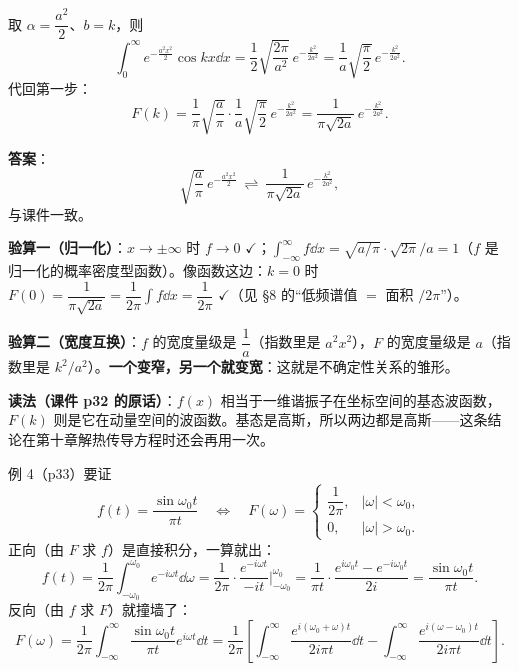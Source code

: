 \documentclass[11pt]{ctexart}
\begin{document}

取 $\alpha=\dfrac{a^{2}}{2}$、$b=k$，则
\[ \int_0^{\infty}e^{-\frac{a^{2}x^{2}}{2}}\cos kx\dd x=\frac{1}{2}\sqrt{\frac{2\pi}{a^{2}}}\,e^{-\frac{k^{2}}{2a^{2}}}=\frac{1}{a}\sqrt{\frac{\pi}{2}}\,e^{-\frac{k^{2}}{2a^{2}}} .\]
代回第一步：
\[
F(k)=\frac{1}{\pi}\sqrt{\frac{a}{\pi}}\cdot\frac{1}{a}\sqrt{\frac{\pi}{2}}\,e^{-\frac{k^{2}}{2a^{2}}}
=\frac{1}{\pi\sqrt{2a}}\,e^{-\frac{k^{2}}{2a^{2}}} .
\]

\textbf{答案}：
\[ \sqrt{\frac{a}{\pi}}\,e^{-\frac{a^{2}x^{2}}{2}}\ \rightleftharpoons\ \frac{1}{\pi\sqrt{2a}}\,e^{-\frac{k^{2}}{2a^{2}}} ,\]
与课件一致。


\textbf{验算一（归一化）}：$x\to\pm\infty$ 时 $f\to0$ $\checkmark$；$\int_{-\infty}^{\infty}f\dd x=\sqrt{a/\pi}\cdot\sqrt{2\pi}/a=1$（$f$ 是归一化的概率密度型函数）。像函数这边：$k=0$ 时 $F(0)=\dfrac{1}{\pi\sqrt{2a}}=\dfrac{1}{2\pi}\int f\dd x=\dfrac{1}{2\pi}$ $\checkmark$（见 §8 的“低频谱值 $=$ 面积 $/2\pi$”）。

\textbf{验算二（宽度互换）}：$f$ 的宽度量级是 $\dfrac{1}{a}$（指数里是 $a^{2}x^{2}$），$F$ 的宽度量级是 $a$（指数里是 $k^{2}/a^{2}$）。\textbf{一个变窄，另一个就变宽}：这就是不确定性关系的雏形。

\textbf{读法（课件 p32 的原话）}：$f(x)$ 相当于一维谐振子在坐标空间的基态波函数，$F(k)$ 则是它在动量空间的波函数。基态是高斯，所以两边都是高斯——这条结论在第十章解热传导方程时还会再用一次。



例 4（p33）要证
\[ f(t)=\frac{\sin\omega_0t}{\pi t}\quad\Longleftrightarrow\quad F(\omega)=\begin{cases}\dfrac{1}{2\pi}, & |\omega|<\omega_0,\\[4pt] 0, & |\omega|>\omega_0 .\end{cases}
\]
正向（由 $F$ 求 $f$）是直接积分，一算就出：
\[
f(t)=\frac{1}{2\pi}\int_{-\omega_0}^{\omega_0}e^{-i\omega t}\dd\omega
=\frac{1}{2\pi}\cdot\frac{e^{-i\omega t}}{-it}\Big|_{-\omega_0}^{\omega_0}
=\frac{1}{\pi t}\cdot\frac{e^{i\omega_0t}-e^{-i\omega_0t}}{2i}
=\frac{\sin\omega_0t}{\pi t} .
\]
反向（由 $f$ 求 $F$）就撞墙了：
\[
F(\omega)=\frac{1}{2\pi}\int_{-\infty}^{\infty}\frac{\sin\omega_0t}{\pi t}e^{i\omega t}\dd t
=\frac{1}{2\pi}\left[\int_{-\infty}^{\infty}\frac{e^{i(\omega_0+\omega)t}}{2i\pi t}\dd t-\int_{-\infty}^{\infty}\frac{e^{i(\omega-\omega_0)t}}{2i\pi t}\dd t\right] .
\]
\end{document}
